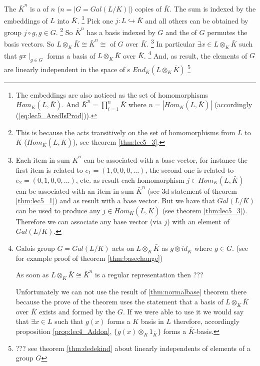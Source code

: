 The $\bar{K}^n$ is a  of $n$
($n = \left|G = Gal\left(L/K\right)\right|$)
copies of $\bar{K}$.
The sum is indexed by the embeddings of $L$ into
$\bar{K}$.
\footnote{
  The embeddings are also noticed as the set of 
  homomorphisms $Hom_K\left(L, \bar{K}\right)$.
  And $\bar{K}^n = \prod_{i=1}^n\bar{K}$ where
  $n = \left|Hom_K\left(L, \bar{K}\right)\right|$ (accordingly
  (\ref{eq:lec5_AredIsProd})).
}
Pick one $j: L \hookrightarrow \bar{K}$ and all others can
be obtained by group  $j \circ g, g \in G$.
\footnote{
  This is because the  acts transitively on
  the set of homomorphisms from $L$ to $\bar{K}$ ($Hom_K\left(L,
  \bar{K}\right)$), see theorem \ref{thm:lec5_3}. 
}
So
$\bar{K}^n$ has a basis indexed by $G$ and the  of
$G$ permutes the basis vectors. So $L \otimes_K \bar{K} \cong
\bar{K}^n \cong$  of $G$ over
$\bar{K}$.
\footnote{
  Each item in sum $\bar{K}^n$ can be associated with a base vector,
  for instance the first item is related to $e_1 = (1,0,0,0,\dots)$,
  the second one is related to $e_2 = (0,1,0,0,\dots)$, etc. as result
  each homomorphism $j \in Hom_K\left(L,\bar{K}\right)$ can be
  associated with an item in sum $\bar{K}^n$
  (see 3d statement of theorem \ref{thm:lec5_1})
  and as result with a base
  vector. But we have that $Gal\left(L/K\right)$ can be used to
  produce any $j \in Hom_K\left(L,\bar{K}\right)$ (see theorem
  \ref{thm:lec5_3}). Therefore we can 
  associate any base vector (via $j$) with an element of
  $Gal\left(L/K\right)$.
}
In particular $\exists x \in L \otimes_K \bar{K}$
such that $gx \mid_{g \in G}$
forms a basis of $L \otimes_K \bar{K}$ over $\bar{K}$.
\footnote{
  Galois group $G = Gal\left(L/K\right)$ acts on
  $L \otimes_K \bar{K}$ as $g \otimes id_{\bar{K}}$ where $g \in G$.
  (see for example proof of theorem \ref{thm:basechange})

  As soon as $L \otimes_K \bar{K} \cong \bar{K}^n$ is a regular
  representation  then ???
  
  Unfortunately we can not use the result of \ref{thm:normalbase}
  theorem there 
  because the prove of the theorem uses the statement that
  a basis of $L \otimes_K \bar{K}$ over $\bar{K}$
  exists and formed by the $G$. If we were able to use it we would say 
  that $\exists x \in L$ such that $g(x)$ forms a $K$ basis in $L$
  therefore,  accordingly proposition \ref{prop:lec4_Addon},
  $\{g(x) \otimes_K 1_{\bar{K}}\}$ forms a $\bar{K}$-basis. 
} And, as result, the elements of $G$ are linearly independent in the space of
s
$End_{\bar{K}}\left(L \otimes_K \bar{K}\right)$
\footnote{
  ??? see theorem \ref{thm:dedekind} about linearly independents of
  elements of a group $G$
}

